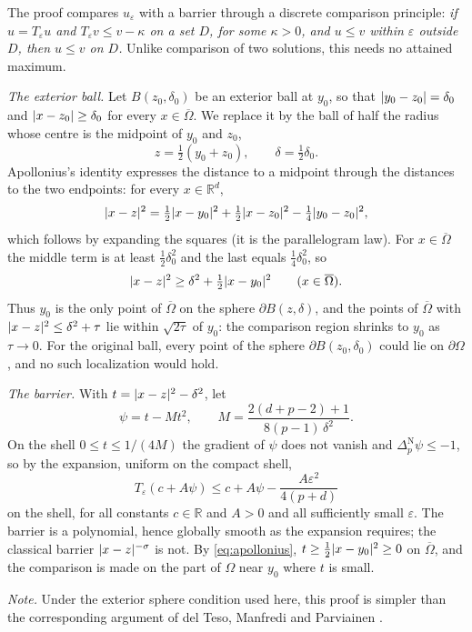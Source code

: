 \documentclass[11pt,reqno]{amsart}
\newcommand{\R}{\mathbb{R}}
\newcommand{\eps}{\varepsilon}
\newcommand{\pnlap}{\Delta_p^{\mathrm{N}}}       %
\newcommand{\Op}{T_{\eps}}                       %
\DeclarePairedDelimiter{\abs}{\lvert}{\rvert}
\theoremstyle{plain}
\theoremstyle{definition}
\theoremstyle{remark}
\begin{document}
The proof compares $u_\eps$ with a barrier through a discrete comparison
principle: \emph{if $u = \Op u$ and $\Op v \le v - \kappa$ on a set $D$, for
some $\kappa > 0$, and $u \le v$ within $\eps$ outside $D$, then $u \le v$ on
$D$.} Unlike comparison of two solutions, this needs no attained maximum.

\emph{The exterior ball.} Let $B(z_0,\delta_0)$ be an exterior ball at $y_0$,
so that $\abs{y_0 - z_0} = \delta_0$ and $\abs{x - z_0} \ge \delta_0$ for every
$x \in \overline\Omega$. We replace it by the ball of half the radius whose
centre is the midpoint of $y_0$ and $z_0$,
\[
  z = \tfrac12(y_0 + z_0), \qquad \delta = \tfrac12\delta_0 .
\]
Apollonius's identity expresses the distance to a midpoint through the
distances to the two endpoints: for every $x \in \R^d$,
\[
  \abs{x - z}^2 = \tfrac12\abs{x - y_0}^2 + \tfrac12\abs{x - z_0}^2
    - \tfrac14\abs{y_0 - z_0}^2 ,
\]
which follows by expanding the squares (it is the parallelogram law). For
$x \in \overline\Omega$ the middle term is at least $\frac12\delta_0^2$ and the
last equals $\frac14\delta_0^2$, so
\begin{equation}\label{eq:apollonius}
  \abs{x - z}^2 \ge \delta^2 + \tfrac12\abs{x - y_0}^2
  \qquad (x \in \overline\Omega).
\end{equation}
Thus $y_0$ is the only point of $\overline\Omega$ on the sphere
$\partial B(z,\delta)$, and the points of $\overline\Omega$ with
$\abs{x - z}^2 \le \delta^2 + \tau$ lie within $\sqrt{2\tau}$ of $y_0$: the
comparison region shrinks to $y_0$ as $\tau \to 0$. For the original ball,
every point of the sphere $\partial B(z_0,\delta_0)$ could lie on
$\partial\Omega$, and no such localization would hold.

\emph{The barrier.} With $t = \abs{x - z}^2 - \delta^2$, let
\[
  \psi = t - Mt^2, \qquad M = \frac{2(d + p - 2) + 1}{8(p-1)\,\delta^2}.
\]
On the shell $0 \le t \le 1/(4M)$ the gradient of $\psi$ does not vanish and
$\pnlap\psi \le -1$, so by the expansion, uniform on the compact shell,
\[
  \Op(c + A\psi) \le c + A\psi - \frac{A\eps^2}{4(p+d)}
\]
on the shell, for all constants $c \in \R$ and $A > 0$ and all sufficiently
small $\eps$. The barrier is a polynomial, hence globally smooth as the
expansion requires; the classical barrier $\abs{x - z}^{-\sigma}$ is not. By
\eqref{eq:apollonius}, $t \ge \frac12\abs{x - y_0}^2 \ge 0$ on
$\overline\Omega$, and the comparison is made on the part of $\Omega$ near
$y_0$ where $t$ is small.

\smallskip
\noindent\emph{Note.} Under the exterior sphere condition used here, this
proof is simpler than the corresponding argument of del Teso, Manfredi
and Parviainen \cite{dTMP22}.
\end{document}
